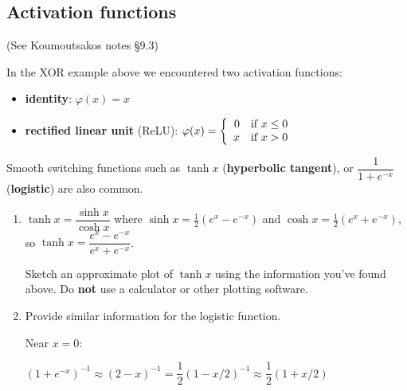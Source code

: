 \documentclass[12pt,letterpaper,noanswers]{exam}
\newcommand{\note}[1]{{#1}} %
\begin{document}
\subsection*{Activation functions}

(See Koumoutsakos notes \S 9.3)
\note{
\begin{tcolorbox}
In the XOR example above we encountered two activation functions:
\begin{itemize}
\itemsep0pt
    \item \textbf{identity}: $\varphi(x) = x$
    \item \textbf{rectified linear unit} (ReLU): $\varphi(x) = \left\{\begin{array}{r r}
    0 & \text{if }x\leq 0 \\
    x & \text{if }x>0\end{array}\right.$
\end{itemize}
Smooth switching functions such as $\tanh x$ (\textbf{hyperbolic tangent}), or $\dfrac{1}{1+e^{-x}}$ (\textbf{logistic}) are also common.
\end{tcolorbox}
}
\begin{enumerate}[resume=classQ]
\item $\tanh x = \dfrac{\sinh x}{\cosh x}$ where $\sinh x = \frac{1}{2}\left(e^{x}-e^{-x}\right)$ and $\cosh x = \frac{1}{2}\left(e^{x}+e^{-x}\right)$, so $\tanh x = \dfrac{e^x-e^{-x}}{e^x+e^{-x}}$.


Sketch an approximate plot of $\tanh x$ using the information you've found above.  Do \textbf{not} use a calculator or other plotting software.
\vspace{1.5in}

\item Provide similar information for the logistic function.

Near $x=0$:

$(1+e^{-x})^{-1}\approx (2-x)^{-1} = \dfrac{1}{2}(1-x/2)^{-1} \approx \dfrac{1}{2}(1+x/2)$
\end{enumerate}
\vspace{1.7in}
\end{document}
